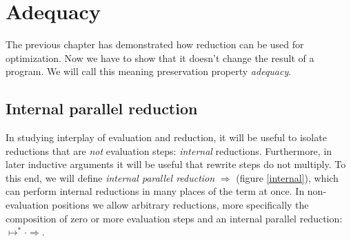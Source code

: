\documentclass[a4paper, 11pt,titlepage, openright, twoside]{report}
\newcommand{\Int}{\Rightarrow}
\newcommand{\+}{\enspace}
\begin{document}
\chapter{Adequacy}

The previous chapter has demonstrated how reduction can be used for optimization.
Now we have to show that it doesn't change the result of a program.
We will call this meaning preservation property \textit{adequacy}.

\section{Internal parallel reduction}
In studying interplay of evaluation and reduction,
it will be useful to isolate reductions that are \textit{not} evaluation steps: \textit{internal} reductions.
Furthermore, in later inductive arguments it will be useful that rewrite steps do not multiply.
To this end, we will define \textit{internal parallel reduction} $\Int$ (figure \ref{internal}),
which can perform internal reductions in many places of the term at once.
In non-evaluation positions we allow arbitrary reductions,
more specifically the composition of zero or more evaluation steps and
an internal parallel reduction: $↦^* · \Int$.
\end{document}
